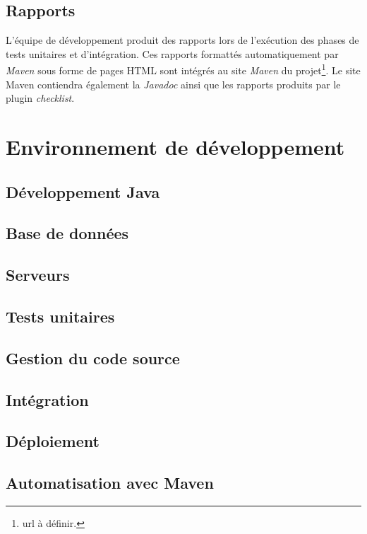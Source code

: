 \documentclass[11pt]{article}
\begin{document}
\subsection{Rapports}

L'équipe de développement produit des rapports lors de l'exécution des phases
de tests unitaires et d'intégration. Ces rapports formattés automatiquement
par \emph{Maven} sous forme de pages HTML sont intégrés au site \emph{Maven} du
projet\footnote{url à définir.}. Le site Maven contiendra également la \emph{Javadoc} ainsi que les rapports produits par le plugin \emph{checklist}.


\section{Environnement de développement}
\label{env-dev}

\subsection{Développement Java}

\subsection{Base de données}

\subsection{Serveurs}

\subsection{Tests unitaires}

\subsection{Gestion du code source}

\subsection{Intégration}

\subsection{Déploiement}

\subsection{Automatisation avec Maven}
\end{document}
